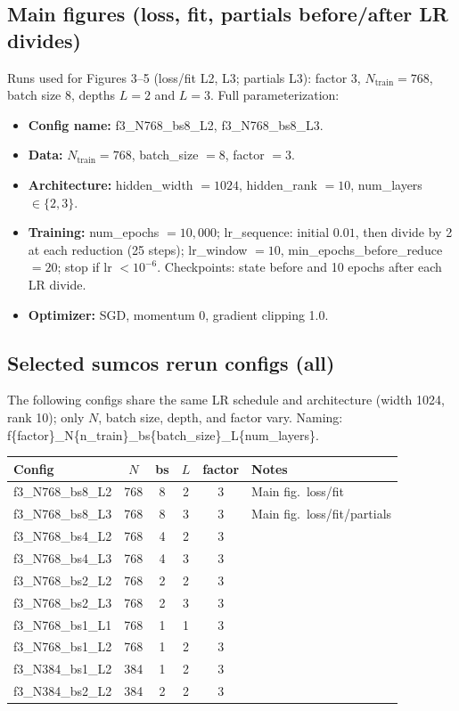 \documentclass{article}
\begin{document}
\subsection{Main figures (loss, fit, partials before/after LR divides)}
Runs used for Figures 3--5 (loss/fit L2, L3; partials L3): factor 3, $N_{\mathrm{train}}=768$, batch size 8, depths $L=2$ and $L=3$. Full parameterization:
\begin{itemize}
\item \textbf{Config name:} f3\_N768\_bs8\_L2, f3\_N768\_bs8\_L3.
\item \textbf{Data:} $N_{\mathrm{train}}=768$, batch\_size $=8$, factor $=3$.
\item \textbf{Architecture:} hidden\_width $=1024$, hidden\_rank $=10$, num\_layers $\in \{2,3\}$.
\item \textbf{Training:} num\_epochs $=10{,}000$; lr\_sequence: initial $0.01$, then divide by 2 at each reduction (25 steps); lr\_window $=10$, min\_epochs\_before\_reduce $=20$; stop if lr $< 10^{-6}$. Checkpoints: state before and 10 epochs after each LR divide.
\item \textbf{Optimizer:} SGD, momentum $0$, gradient clipping 1.0.
\end{itemize}

\subsection{Selected sumcos rerun configs (all)}
The following configs share the same LR schedule and architecture (width 1024, rank 10); only $N$, batch size, depth, and factor vary. Naming: f\{factor\}\_N\{n\_train\}\_bs\{batch\_size\}\_L\{num\_layers\}.

\begin{center}
\begin{tabular}{lccccl}
\hline
Config & $N$ & bs & $L$ & factor & Notes \\
\hline
f3\_N768\_bs8\_L2 & 768 & 8 & 2 & 3 & Main fig.\ loss/fit \\
f3\_N768\_bs8\_L3 & 768 & 8 & 3 & 3 & Main fig.\ loss/fit/partials \\
f3\_N768\_bs4\_L2 & 768 & 4 & 2 & 3 & \\
f3\_N768\_bs4\_L3 & 768 & 4 & 3 & 3 & \\
f3\_N768\_bs2\_L2 & 768 & 2 & 2 & 3 & \\
f3\_N768\_bs2\_L3 & 768 & 2 & 3 & 3 & \\
f3\_N768\_bs1\_L1 & 768 & 1 & 1 & 3 & \\
f3\_N768\_bs1\_L2 & 768 & 1 & 2 & 3 & \\
f3\_N384\_bs1\_L2 & 384 & 1 & 2 & 3 & \\
f3\_N384\_bs2\_L2 & 384 & 2 & 2 & 3 & \\
\hline
\end{tabular}
\end{center}
\end{document}
